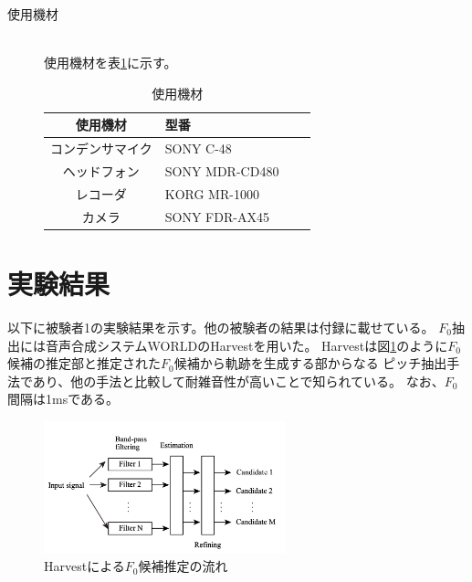 \documentclass[10.5ptj,a4j,dvipdfmx,uplatex, oneside, openany, report]{jsbook}%
\begin{document}
\begin{description}
    \item[使用機材]\mbox{}\\
        使用機材を表\ref{table:items}に示す。
        \begin{table}[h]
            \caption{使用機材}
            \label{table:items}
            \centering
            \begin{tabular}{clll}
                \hline
                使用機材 & 型番 \\
                \hline \hline
                コンデンサマイク & SONY C-48\\
                ヘッドフォン & SONY MDR-CD480\\
                レコーダ & KORG MR-1000\\
                カメラ & SONY FDR-AX45\\
                \hline
            \end{tabular}
        \end{table}
        
\end{description}








\section{実験結果}
以下に被験者1の実験結果を示す。他の被験者の結果は付録に載せている。
$F_0$抽出には音声合成システムWORLD\cite{world}のHarvest\cite{harvest}を用いた。
Harvestは図\ref{fig:harvest}のように$F_0$候補の推定部と推定された$F_0$候補から軌跡を生成する部からなる
ピッチ抽出手法であり、他の手法と比較して耐雑音性が高いことで知られている。
なお、$F_0$間隔は1msである。

\begin{figure}[thbp]
    \begin{center}
      \includegraphics[clip,width=7.0cm]{harvest.png}
      \caption{Harvestによる$F_0$候補推定の流れ\cite{harvest}}
      \label{fig:harvest}
    \end{center}
\end{figure}
\end{document}
